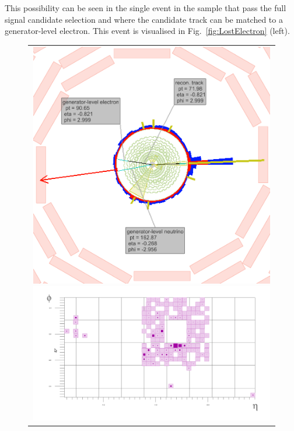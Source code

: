 This possibility can be seen in the single event in the \WJets sample that pass the full signal candidate selection and where the candidate track can be matched to a generator-level electron. 
This event is visualised in Fig.~\ref{fig:LostElectron} (left). 
\begin{figure}[!p]
  \centering 
  \begin{tabular}{c}
  \begin{minipage}[c]{0.49\textwidth}
  \centering
  \includegraphics[width=0.99\textwidth]{figures/analysis/Electron_lumi_279317_event_111637553.png}
  \end{minipage} 
  \begin{minipage}[c]{0.49\textwidth}
  \centering
  \includegraphics[width=0.99\textwidth]{figures/analysis_2/Background/TowerDetailViewZoom.png}

\end{minipage}
\end{tabular}
\end{figure}
